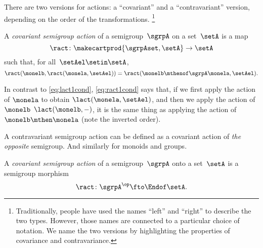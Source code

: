 There are two versions for actions: a ``covariant'' and a ``contravariant'' version, depending on the order of the transformations.
\footnote{
    Traditionally, people have used the names ``left'' and ``right'' to describe the two types.
    However, those names are connected to a particular choice of notation.
    We name the two versions by highlighting the properties of covariance and contravariance.
}

\begin{ctdefinition}
    \label{def:semigroup-contra-action-prelim}
    A \emph{covariant semigroup action} of a semigroup~$\sgrpA$ on a set~$\setA$ is a map
    \begin{equation}
        \label{eq:ract}
        \ract \colon \makecartprod{\sgrpAset, \setA} \to \setA
    \end{equation}
    such that, for all~$\setAel \setin \setA$,
    \begin{equation}
        \label{eq:ract1cond}
        \ract(\monelb, \ract(\monela, \setAel)) = \ract(\monelb \mthenof\sgrpA  \monela, \setAel).
    \end{equation}
\end{ctdefinition}

In contrast to \cref{eq:lact1cond},  \cref{eq:ract1cond} says that, if we first apply the action of $\monela$ to obtain $\lact(\monela, \setAel)$,
and then we apply the action of $\monelb$ $\lact(\monelb, -)$, it is the same thing as applying the action of $\monelb\mthen\monela$ (note the inverted order).

A contravariant semigroup action can be defined as a covariant action of \emph{the opposite} semigroup.
And similarly for monoids and groups.

\begin{ctdefinition}
    \label{def:semigroup-cont-action}
    A \emph{covariant semigroup action} of a semigroup~$\sgrpA$ onto a set~$\setA$ is a semigroup morphism
    \begin{equation}
        \ract \colon \sgrpA^{\op} \fto \Endof\setA.
    \end{equation}
\end{ctdefinition}

